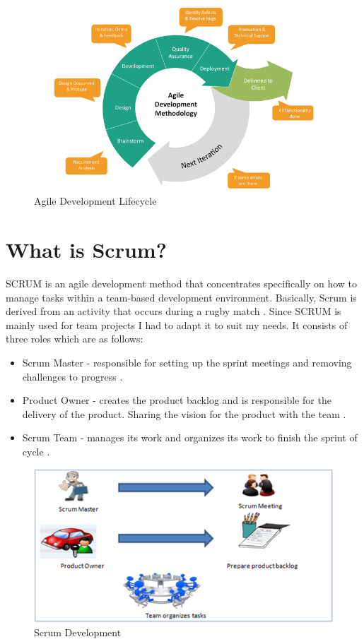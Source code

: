 \begin{figure}[h]
\centering
\includegraphics[scale=0.4]{img/agile-development-chart.png}
\caption{Agile Development Lifecycle}
\label{Agile}
\end{figure}


\newpage

\section{What is Scrum?}
SCRUM is an agile development method that concentrates specifically on how to manage tasks within a team-based development environment. Basically, Scrum is derived from an activity that occurs during a rugby match \cite{Agile}. Since SCRUM is mainly used for team projects I had to adapt it to suit my needs. It consists of three roles which are as follows:

\begin{itemize}
    \item Scrum Master - responsible for setting up the sprint meetings and removing challenges to progress \cite{Agile}.
    \item Product Owner -  creates the product backlog and is responsible for the delivery of the product. Sharing the vision for the product with the team \cite{Agile}.
    \item Scrum Team - manages its work and organizes its work to finish the sprint of cycle \cite{Agile}.
\end{itemize}

\begin{figure}[h]
\centering
\includegraphics[scale=0.4]{img/scrum.png}
\caption{Scrum Development}
\label{Scrum}
\end{figure}

